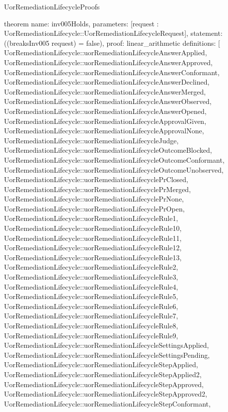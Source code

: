 \begin{lexlean}{UorRemediationLifecycleProofs}
\begin{semanticmodule}
theorem{
  name: inv005Holds,
  parameters: [request : UorRemediationLifecycle::UorRemediationLifecycleRequest],
  statement: ((breaksInv005 request) = false),
  proof: linear_arithmetic{
    definitions: [
      UorRemediationLifecycle::uorRemediationLifecycleAnswerApplied,
      UorRemediationLifecycle::uorRemediationLifecycleAnswerApproved,
      UorRemediationLifecycle::uorRemediationLifecycleAnswerConformant,
      UorRemediationLifecycle::uorRemediationLifecycleAnswerDeclined,
      UorRemediationLifecycle::uorRemediationLifecycleAnswerMerged,
      UorRemediationLifecycle::uorRemediationLifecycleAnswerObserved,
      UorRemediationLifecycle::uorRemediationLifecycleAnswerOpened,
      UorRemediationLifecycle::uorRemediationLifecycleApprovalGiven,
      UorRemediationLifecycle::uorRemediationLifecycleApprovalNone,
      UorRemediationLifecycle::uorRemediationLifecycleJudge,
      UorRemediationLifecycle::uorRemediationLifecycleOutcomeBlocked,
      UorRemediationLifecycle::uorRemediationLifecycleOutcomeConformant,
      UorRemediationLifecycle::uorRemediationLifecycleOutcomeUnobserved,
      UorRemediationLifecycle::uorRemediationLifecyclePrClosed,
      UorRemediationLifecycle::uorRemediationLifecyclePrMerged,
      UorRemediationLifecycle::uorRemediationLifecyclePrNone,
      UorRemediationLifecycle::uorRemediationLifecyclePrOpen,
      UorRemediationLifecycle::uorRemediationLifecycleRule1,
      UorRemediationLifecycle::uorRemediationLifecycleRule10,
      UorRemediationLifecycle::uorRemediationLifecycleRule11,
      UorRemediationLifecycle::uorRemediationLifecycleRule12,
      UorRemediationLifecycle::uorRemediationLifecycleRule13,
      UorRemediationLifecycle::uorRemediationLifecycleRule2,
      UorRemediationLifecycle::uorRemediationLifecycleRule3,
      UorRemediationLifecycle::uorRemediationLifecycleRule4,
      UorRemediationLifecycle::uorRemediationLifecycleRule5,
      UorRemediationLifecycle::uorRemediationLifecycleRule6,
      UorRemediationLifecycle::uorRemediationLifecycleRule7,
      UorRemediationLifecycle::uorRemediationLifecycleRule8,
      UorRemediationLifecycle::uorRemediationLifecycleRule9,
      UorRemediationLifecycle::uorRemediationLifecycleSettingsApplied,
      UorRemediationLifecycle::uorRemediationLifecycleSettingsPending,
      UorRemediationLifecycle::uorRemediationLifecycleStepApplied,
      UorRemediationLifecycle::uorRemediationLifecycleStepApplied2,
      UorRemediationLifecycle::uorRemediationLifecycleStepApproved,
      UorRemediationLifecycle::uorRemediationLifecycleStepApproved2,
      UorRemediationLifecycle::uorRemediationLifecycleStepConformant,
}}
\end{semanticmodule}
\end{lexlean}
